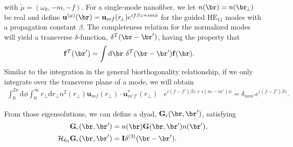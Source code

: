 \documentclass[]{report}
\begin{document}
with $ \tilde{\mu}=(\omega_0,-m,-f) $. For a single-mode nanofiber, we let $ n(\br)=n(\br\!_\perp) $ be real and define $ \mathbf{u}^{(\mu)}(\br)=\mathbf{u}_{mf}(r\!_\perp )e^{if\beta z+im\phi} $ for the guided $\mathrm{HE}_{11}$ modes with a propagation constant $ \beta  $. The completeness relation for the normalized modes will yield a transverse $ \delta $-function, $ \delta^T(\br-\br') $, having the property that
\begin{align}
\mathbf{f}^T(\br')&=\int \mathrm{d}\br\,\, \delta^T(\br-\br')\mathbf{f}(\br).
\end{align} 
Similar to the integration in the general biorthogonality relationship, if we only integrate over the transverse plane of a mode, we will obtain
\begin{align}
\int_0^{2\pi}\!\!\!\!\! \mathrm{d}\phi\!\! \int_0^\infty\!\!\!\! r\!_\perp \mathrm{d}r\!_\perp  n^2(r\!_\perp) \mathbf{u}_{mf}(r\!_\perp )\!\cdot\!\mathbf{u}_{m'f'}^*(r\!_\perp )& e^{i(f\!-\!f')\beta z+i(m\! -\! m')\phi}  =\delta_{mm'}e^{i(f\!-\!f')\beta z} \label{eq:orthutrans2D}.
\end{align}


From those eigensolutions, we can define a dyad, $ \mathbf{G}_\epsilon(\br,\br') $, satisfying
\begin{align}
\mathbf{G}_\epsilon(\br,\br') &= n(\br) \mathbf{G}(\br,\br') n(\br'),\\
\mathcal{H}_{k_0} \mathbf{G}_\epsilon(\br,\br') &= \mathbf{I}\delta^{(3)}(\br-\br').\label{eq:HGtilde}
\end{align}
\end{document}
